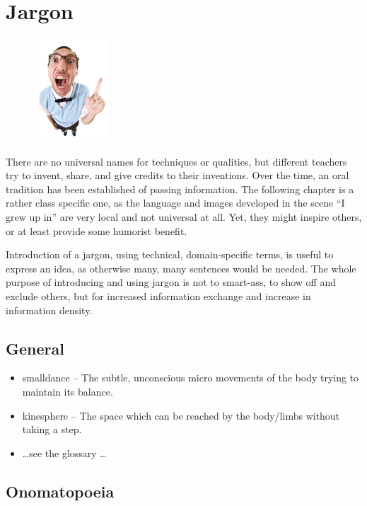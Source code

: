 \section{Jargon}\label{sec:jargon}

\begin{figure}
    \centering
    \includegraphics[width=0.25\textwidth]{images/jargon}
\end{figure}

There are no universal names for techniques or qualities, but different teachers try to invent, share, and give credits to their inventions.
Over the time, an oral tradition has been established of passing information.
The following chapter is a rather class specific one, as the language and images developed in the scene ``I grew up in'' are very local and not universal at all.
Yet, they might inspire others, or at least provide some humorist benefit.

Introduction of a jargon, using technical, domain-specific terms, is useful to express an idea, as otherwise many, many sentences would be needed.
The whole purpose of introducing and using jargon is not to smart-ass, to show off and exclude others, but for increased information exchange and increase in information density.

\subsection{General}\label{subsec:general}

\begin{itemize}
    \item \gls{smalldance} -- The subtle, unconscious micro movements of the body trying to maintain its balance.
    \item \gls{kinesphere} -- The space which can be reached by the body/limbs without taking a step.
    \item \ldots see the glossary \ldots
\end{itemize}

\subsection{Onomatopoeia}\label{subsec:onomatopoeia}

